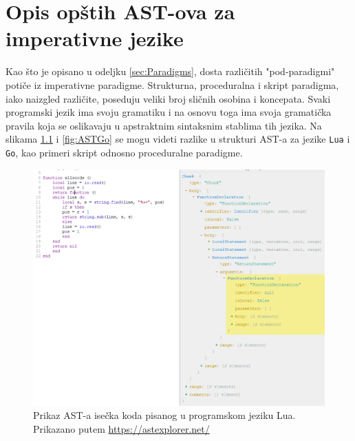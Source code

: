 \chapter{Opis opštih AST-ova za imperativne jezike}
\label{chp:MyAST}

Kao što je opisano u odeljku \ref{sec:Paradigms}, dosta različitih "pod-paradigmi" potiče iz imperativne paradigme. Strukturna, proceduralna i skript paradigma, iako naizgled različite, poseduju veliki broj sličnih osobina i koncepata. Svaki programski jezik ima svoju gramatiku i na osnovu toga ima svoja gramatička pravila koja se oslikavaju u apstraktnim sintaksnim stablima tih jezika. Na slikama \ref{fig:ASTLua} i \ref{fig:ASTGo} se mogu videti razlike u strukturi AST-a za jezike \texttt{Lua} i \texttt{Go}, kao primeri skript odnosno proceduralne paradigme.

\begin{figure}[h!]
    \centering
        \includegraphics[scale=0.6]{images/ast_lua.png}
    \caption{Prikaz AST-a isečka koda pisanog u programskom jeziku Lua. Prikazano putem \url{https://astexplorer.net/}}
    \label{fig:ASTLua}
\end{figure}

